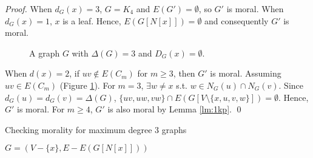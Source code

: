 \begin{proof}
When $d_G(x)=3$, $G=K_4$ and $E(G')=\emptyset$, so $G'$ is moral. When $d_G(x)=1$, $x$ is a leaf. Hence, $E(G[N[x]])=\emptyset$ and consequently $G'$ is moral.
\begin{figure}[H]
\centering
{}
\caption{A graph $G$ with $\Delta(G)=3$ and $D_G(x)=\emptyset$.}
\label{fg:deg3_1k3}
\end{figure}
When $d(x)=2$, if $uv \notin E(C_m)$ for $m \ge 3$, then $G'$ is moral. Assuming $uv \in E(C_m)$ (Figure \ref{fg:deg3_1k3}). For $m=3$, $\exists w \neq x$ s.t. $w \in N_G(u) \cap N_G(v)$. Since $d_G(u)=d_G(v)=\Delta(G)$, $\{uv,uw,vw\} \cap E(G[V\setminus \{x,u,v,w\}]) = \emptyset$. Hence, $G'$ is moral. For $m\ge 4$, $G'$ is also moral by Lemma \ref{lm:1kp}. \qed
\end{proof}

\begin{algorithm}[]
\caption{Checking morality for maximum degree 3 graphs}
\label{alg:wrs_deg3}
\begin{algorithmic}[]
    
    	\State $G=(V-\{x\},E-E(G[N[x]]))$    	
    \EndWhile
       
     
    \Else 
    
    \EndIf
\end{algorithmic}
\end{algorithm}

